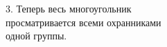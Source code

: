 \documentclass[preview]{standalone}
\begin{document}
\begin{center}
3. Теперь весь многоугольник\\просматривается всеми охранниками\\одной группы.
\end{center}
\end{document}
